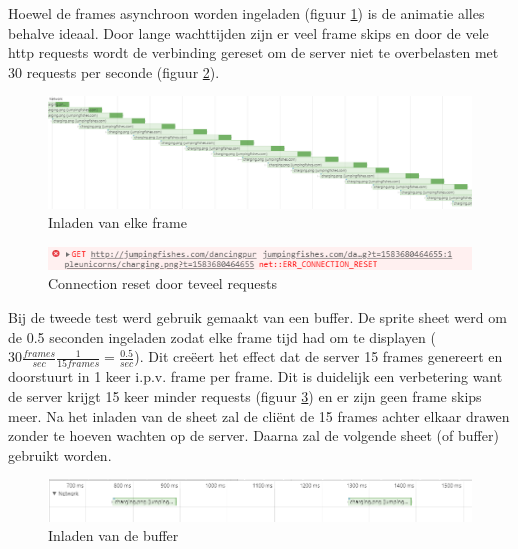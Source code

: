 Hoewel de frames asynchroon worden ingeladen (figuur \ref{inladen}) is de animatie alles behalve ideaal. Door lange wachttijden zijn er veel frame skips en door de vele http requests wordt de verbinding gereset om de server niet te overbelasten met 30 requests per seconde (figuur \ref{reset}).

\begin{figure} [H]
	\centering
	\includegraphics [scale=0.3] {img/inladen.png}
	\caption{Inladen van elke frame} \label{inladen}
\end{figure}

\begin{figure} [H]
	\centering
	\includegraphics [scale=0.7] {img/reset.png}
	\caption{Connection reset door teveel requests} \label{reset}
\end{figure}

Bij de tweede test werd gebruik gemaakt van een buffer. De sprite sheet werd om de 0.5 seconden ingeladen zodat elke frame tijd had om te displayen ($30 \frac{frames}{sec} \frac{1}{15 frames}=\frac{0.5}{sec} $). Dit creëert het effect dat de server 15 frames genereert en doorstuurt in 1 keer i.p.v. frame per frame. Dit is duidelijk een verbetering want de server krijgt 15 keer minder requests (figuur \ref{inladen2}) en er zijn geen frame skips meer. Na het inladen van de sheet zal de cliënt de 15 frames achter elkaar drawen zonder te hoeven wachten op de server. Daarna zal de volgende sheet (of buffer) gebruikt worden.

\begin{figure} [H]
	\centering
	\includegraphics [scale=0.7] {img/inladen2.png}
	\caption{Inladen van de buffer} \label{inladen2}
\end{figure}
